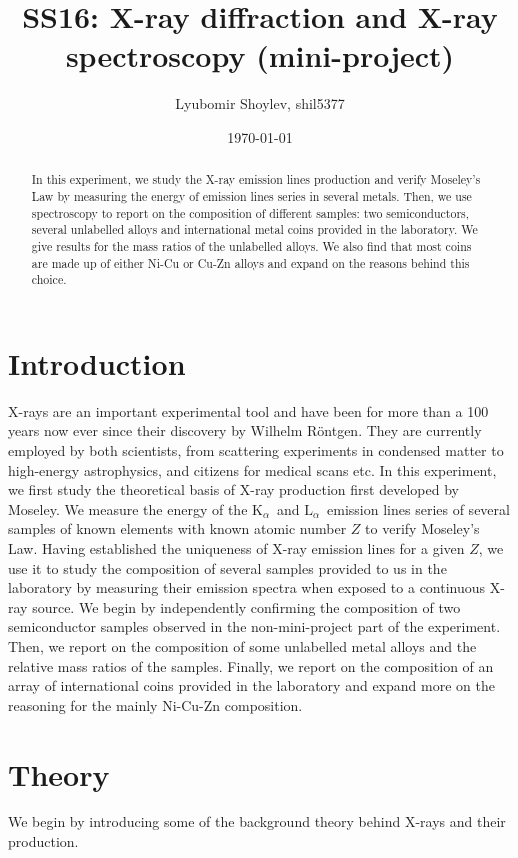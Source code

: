\documentclass[11pt,a4paper,twoside,onecolumn]{article}
\title{\textbf{SS16: X-ray diffraction and X-ray spectroscopy (mini-project)}}
\author{Lyubomir Shoylev, shil5377}
\date{\today}
\newcommand{\Kalpha}{$\mathrm{K}_\alpha$~}
\newcommand{\Lalpha}{$\mathrm{L}_\alpha$~}
\begin{document}
\maketitle

\begin{abstract}
    In this experiment, we study the X-ray emission lines production and verify Moseley's Law by measuring the energy of emission lines series in several metals. Then, we use spectroscopy to report on the composition of different samples: two semiconductors, several unlabelled alloys and international metal coins provided in the laboratory. We give results for the mass ratios of the unlabelled alloys. We also find that most coins are made up of either Ni-Cu or Cu-Zn alloys and expand on the reasons behind this choice.
\end{abstract}

\section{Introduction}
X-rays are an important experimental tool and have been for more than a 100 years now ever since their discovery by Wilhelm R\"{o}ntgen. They are currently employed by both scientists, from scattering experiments in condensed matter to high-energy astrophysics, and citizens for medical scans etc. In this experiment, we first study the theoretical basis of X-ray production first developed by Moseley. We measure the energy of the \Kalpha and \Lalpha emission lines series of several samples of known elements with known atomic number $Z$ to verify Moseley's Law. Having established the uniqueness of X-ray emission lines for a given $Z$, we use it to study the composition of several samples provided to us in the laboratory by measuring their emission spectra when exposed to a continuous X-ray source. We begin by independently confirming the composition of two semiconductor samples observed in the non-mini-project part of the experiment. Then, we report on the composition of some unlabelled metal alloys and the relative mass ratios of the samples. Finally, we report on the composition of an array of international coins provided in the laboratory and expand more on the reasoning for the mainly Ni-Cu-Zn composition.

\section{Theory}
We begin by introducing some of the background theory behind X-rays and their production.
\end{document}
